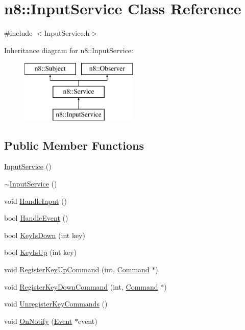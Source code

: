 \hypertarget{classn8_1_1_input_service}{\section{n8\-:\-:Input\-Service Class Reference}
\label{classn8_1_1_input_service}
}


{\ttfamily \#include $<$Input\-Service.\-h$>$}

Inheritance diagram for n8\-:\-:Input\-Service\-:\begin{figure}[H]
\begin{center}
\leavevmode
\includegraphics[height=3.000000cm]{classn8_1_1_input_service}
\end{center}
\end{figure}
\subsection*{Public Member Functions}
\begin{DoxyCompactItemize}
\item 
\hyperlink{classn8_1_1_input_service_a5f141dc8a07dde9ea917fd9c0ae48631}{Input\-Service} ()
\item 
\hyperlink{classn8_1_1_input_service_a11df32939e83610aec40636e4da4fe0c}{$\sim$\-Input\-Service} ()
\item 
void \hyperlink{classn8_1_1_input_service_ab8a0f93cf27cd8255bbb81993c5b3add}{Handle\-Input} ()
\item 
bool \hyperlink{classn8_1_1_input_service_a7c44294b125316e30398cdae2fb8bbb3}{Handle\-Event} ()
\item 
bool \hyperlink{classn8_1_1_input_service_a3b542975c80b74fc1088086645cf5415}{Key\-Is\-Down} (int key)
\item 
bool \hyperlink{classn8_1_1_input_service_a3ce5da16a67e2595a91167b533b7e074}{Key\-Is\-Up} (int key)
\item 
void \hyperlink{classn8_1_1_input_service_a8a5cc25bb823653ce6d4abb55a289cd3}{Register\-Key\-Up\-Command} (int, \hyperlink{classn8_1_1_command}{Command} $\ast$)
\item 
void \hyperlink{classn8_1_1_input_service_a1b0a32e9ed8f21c3138d69d07a9cf90c}{Register\-Key\-Down\-Command} (int, \hyperlink{classn8_1_1_command}{Command} $\ast$)
\item 
void \hyperlink{classn8_1_1_input_service_ab4a13fe0d3e6d6ed6642e7c9df77e884}{Unregister\-Key\-Commands} ()
\item 
void \hyperlink{classn8_1_1_input_service_aa52767bfd35d3785ea236c8175598212}{On\-Notify} (\hyperlink{classn8_1_1_event}{Event} $\ast$event)
\end{DoxyCompactItemize}
